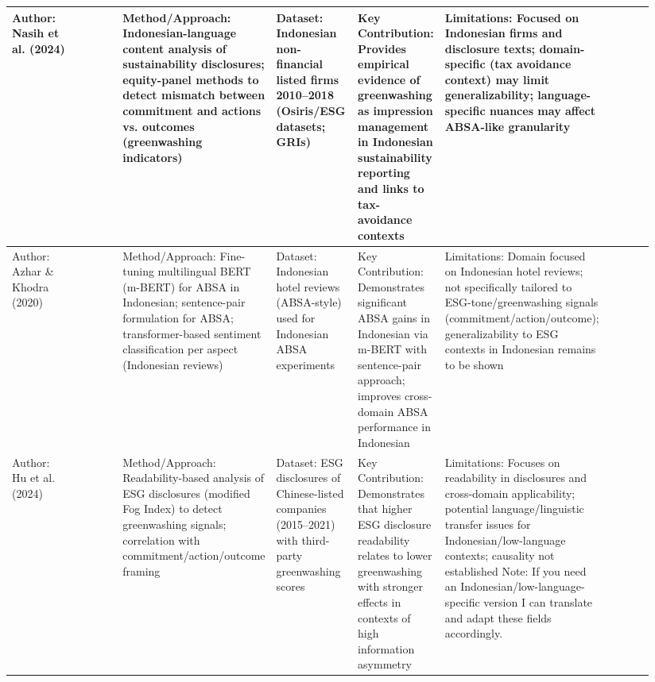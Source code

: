 \documentclass{article}
\begin{document}
\begin{landscape}
\begin{longtable}{p{0.134\linewidth} p{0.134\linewidth} p{0.134\linewidth} p{0.134\linewidth} p{0.134\linewidth} p{0.134\linewidth} p{0.134\linewidth}}
Author: Nasih et al. (2024) & ~ & Method/Approach: Indonesian-language content analysis of sustainability disclosures; equity-panel methods to detect mismatch between commitment and actions vs. outcomes (greenwashing indicators) & Dataset: Indonesian non-financial listed firms 2010–2018 (Osiris/ESG datasets; GRIs) & Key Contribution: Provides empirical evidence of greenwashing as impression management in Indonesian sustainability reporting and links to tax-avoidance contexts & Limitations: Focused on Indonesian firms and disclosure texts; domain-specific (tax avoidance context) may limit generalizability; language-specific nuances may affect ABSA-like granularity & ~ \\ \hline
Author: Azhar \& Khodra (2020) & ~ & Method/Approach: Fine-tuning multilingual BERT (m-BERT) for ABSA in Indonesian; sentence-pair formulation for ABSA; transformer-based sentiment classification per aspect (Indonesian reviews) & Dataset: Indonesian hotel reviews (ABSA-style) used for Indonesian ABSA experiments & Key Contribution: Demonstrates significant ABSA gains in Indonesian via m-BERT with sentence-pair approach; improves cross-domain ABSA performance in Indonesian & Limitations: Domain focused on Indonesian hotel reviews; not specifically tailored to ESG-tone/greenwashing signals (commitment/action/outcome); generalizability to ESG contexts in Indonesian remains to be shown & ~ \\ \hline
Author: Hu et al. (2024) & ~ & Method/Approach: Readability-based analysis of ESG disclosures (modified Fog Index) to detect greenwashing signals; correlation with commitment/action/outcome framing & Dataset: ESG disclosures of Chinese-listed companies (2015–2021) with third-party greenwashing scores & Key Contribution: Demonstrates that higher ESG disclosure readability relates to lower greenwashing with stronger effects in contexts of high information asymmetry & Limitations: Focuses on readability in disclosures and cross-domain applicability; potential language/linguistic transfer issues for Indonesian/low-language contexts; causality not established Note: If you need an Indonesian/low-language-specific version I can translate and adapt these fields accordingly. & ~ \\ \hline

\end{longtable}
\end{landscape}
\end{document}
